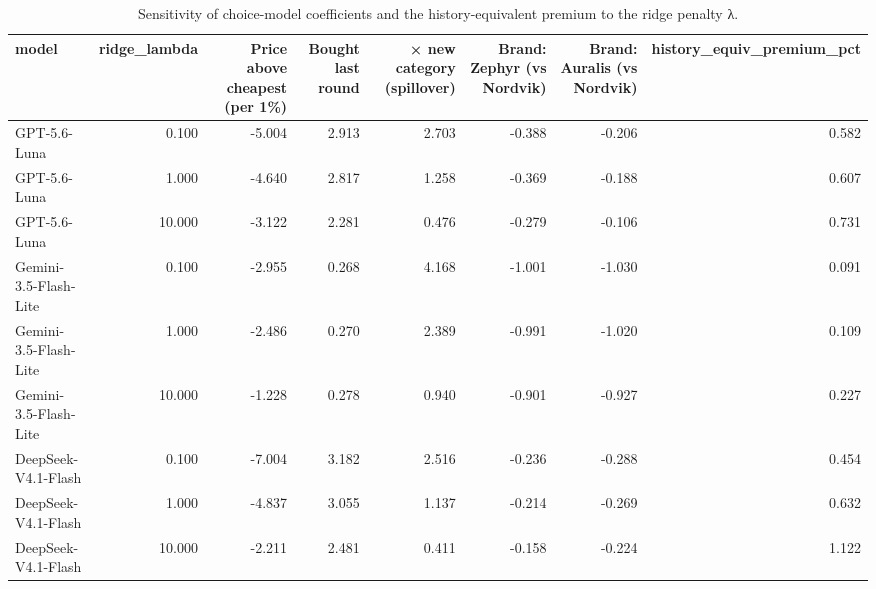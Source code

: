 \begin{table}[htbp]
\centering
\scriptsize
\caption{Sensitivity of choice-model coefficients and the history-equivalent premium to the ridge penalty λ.}
\label{tab:tab20_choice_model_sensitivity}
\begin{tabular}{lrrrrrrr}
\toprule
model & ridge\_lambda & Price above cheapest (per 1\%) & Bought last round & × new category (spillover) & Brand: Zephyr (vs Nordvik) & Brand: Auralis (vs Nordvik) & history\_equiv\_premium\_pct \\
\midrule
GPT-5.6-Luna & 0.100 & -5.004 & 2.913 & 2.703 & -0.388 & -0.206 & 0.582 \\
GPT-5.6-Luna & 1.000 & -4.640 & 2.817 & 1.258 & -0.369 & -0.188 & 0.607 \\
GPT-5.6-Luna & 10.000 & -3.122 & 2.281 & 0.476 & -0.279 & -0.106 & 0.731 \\
Gemini-3.5-Flash-Lite & 0.100 & -2.955 & 0.268 & 4.168 & -1.001 & -1.030 & 0.091 \\
Gemini-3.5-Flash-Lite & 1.000 & -2.486 & 0.270 & 2.389 & -0.991 & -1.020 & 0.109 \\
Gemini-3.5-Flash-Lite & 10.000 & -1.228 & 0.278 & 0.940 & -0.901 & -0.927 & 0.227 \\
DeepSeek-V4.1-Flash & 0.100 & -7.004 & 3.182 & 2.516 & -0.236 & -0.288 & 0.454 \\
DeepSeek-V4.1-Flash & 1.000 & -4.837 & 3.055 & 1.137 & -0.214 & -0.269 & 0.632 \\
DeepSeek-V4.1-Flash & 10.000 & -2.211 & 2.481 & 0.411 & -0.158 & -0.224 & 1.122 \\
\bottomrule
\end{tabular}
\end{table}